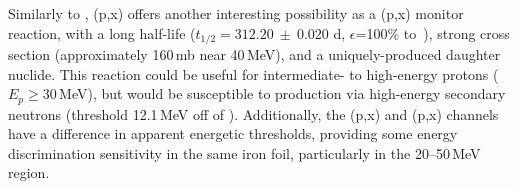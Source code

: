 

Similarly to ,  (p,x)  offers another interesting possibility as a (p,x) monitor reaction,
with a long half-life 
($t_{1/2}=312.20~\pm~0.020$ d, $\epsilon$=100\% to \,\cite{Dong2014}),
strong cross section (approximately 160\,mb near 40\,MeV), and a uniquely-produced daughter nuclide.
This reaction could be useful for intermediate- to high-energy protons ($E_p \geq$30\,MeV), but would be susceptible to production via  high-energy secondary neutrons  (threshold 12.1\,MeV off of ).
Additionally, the (p,x) and (p,x) channels have a difference in apparent energetic thresholds,
providing some energy discrimination sensitivity in the same iron foil, particularly in the 20--50\,MeV region.







% 
% 
% 


